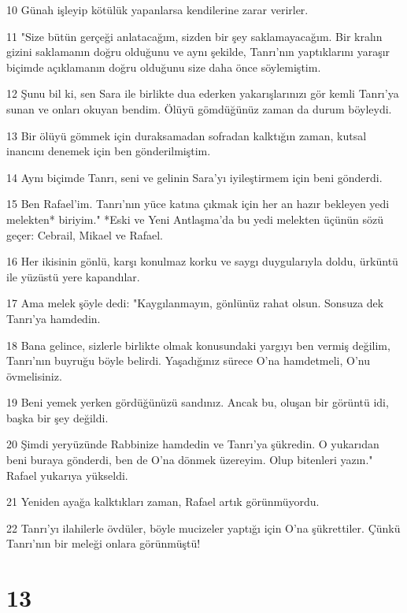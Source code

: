 \par 10 Günah işleyip kötülük yapanlarsa kendilerine zarar verirler.
\par 11 "Size bütün gerçeği anlataca­ğım, sizden bir şey saklamayacağım. Bir kralın gizini saklamanın doğru ol­duğunu ve aynı şekilde, Tanrı'nın yaptıklarını yaraşır biçimde açıklamanın doğru olduğunu size daha önce söyle­miştim.
\par 12 Şunu bil ki, sen Sara ile birlikte dua ederken yakarışlarınızı gör kemli Tanrı'ya sunan ve onları oku­yan bendim. Ölüyü gömdüğünüz za­man da durum böyleydi.
\par 13 Bir ölüyü gömmek için duraksamadan sofradan kalktığın zaman, kutsal inancını dene­mek için ben gönderilmiştim.
\par 14 Aynı biçimde Tanrı, seni ve gelinin Sara'yı iyileştirmem için beni gönderdi.
\par 15 Ben Rafael'im. Tanrı'nın yüce katına çık­mak için her an hazır bekleyen yedi melekten* biriyim." *Eski ve Yeni Antlaşma'da bu yedi melekten üçünün sözü geçer: Cebrail, Mikael ve Rafael.
\par 16 Her ikisinin gönlü, karşı konul­maz korku ve saygı duygularıyla dol­du, ürküntü ile yüzüstü yere kapandı­lar.
\par 17 Ama melek şöyle dedi: "Kaygı­lanmayın, gönlünüz rahat olsun. Son­suza dek Tanrı'ya hamdedin.
\par 18 Bana ge­lince, sizlerle birlikte olmak konusun­daki yargıyı ben vermiş değilim, Tan­rı'nın buyruğu böyle belirdi. Yaşadı­ğınız sürece O'na hamdetmeli, O'nu övmelisiniz.
\par 19 Beni yemek yerken gör­düğünüzü sandınız. Ancak bu, oluşan bir görüntü idi, başka bir şey değildi.
\par 20 Şimdi yeryüzünde Rabbinize hamde­din ve Tanrı'ya şükredin. O yukarıdan beni buraya gönderdi, ben de O'na dön­mek üzereyim. Olup bitenleri yazın." Rafael yukarıya yükseldi.
\par 21 Yeniden ayağa kalktıkları zaman, Rafael artık görünmüyordu.
\par 22 Tanrı'yı ilahilerle övdüler, böyle mucizeler yaptığı için O'na şükrettiler. Çünkü Tanrı'nın bir meleği onlara görünmüştü!

\chapter{13}


